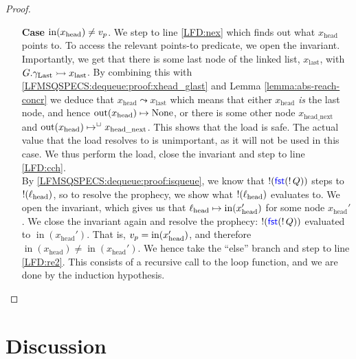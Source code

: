 \documentclass[a4paper, 10pt]{report}
\theoremstyle{definition}
\newcommand{\locN}[1]{\loc_{\mathrm{#1}}}
\newcommand{\lochead}{\locN{head}}
\newcommand{\nIn}[1]{\operatorname{in}(#1)}
\newcommand{\nOut}[1]{\operatorname{out}(#1)}
\newcommand{\node}{x}
\newcommand{\nodeN}[1]{\node_{\mathrm{#1}}}
\newcommand{\nodehead}{\nodeN{head}}
\newcommand{\nodelast}{\nodeN{last}}
\newcommand{\nodeheadnext}{\nodeN{head\_next}}
\newcommand{\prophval}{\val_p}
\newcommand{\Qg}{G}
\newcommand{\glast}{\gname_{\mathrm{Last}}}
\newcommand{\reach}[2]{#1 \leadsto #2}
\newcommand{\ap}[2]{#1 \rightarrowtail #2}
\begin{document}
\begin{proof}
\begin{itemize}
    \item[\textbf{Case}] $\nIn{\nodehead} \neq \prophval$.
    We step to line \ref{LFD:nex} which finds out what $\nodehead$ points to. To access the relevant points-to predicate, we open the invariant. Importantly, we get that there is some last node of the linked list, $\nodelast$, with $\ap{\Qg.\glast}{\nodelast}$. By combining this with \ref{LFMSQSPECS:dequeue:proof:xhead_glast} and Lemma \ref{lemma:abs-reach-concr} we deduce that $\reach{\nodehead}{\nodelast}$ which means that either $\nodehead$ \textit{is} the last node, and hence $\nOut{\nodehead} \mapsto \None$, or there is some other node $\nodeheadnext$ and $\nOut{\nodehead} \mapsto^{\persistently} \nodeheadnext$. This shows that the load is safe. The actual value that the load resolves to is unimportant, as it will not be used in this case. We thus perform the load, close the invariant and step to line \ref{LFD:cch}.\\
    By \ref{LFMSQSPECS:dequeue:proof:isqueue}, we know that $\mathop{!}(\operatorname{\textsf{\color{blue} fst}} (\mathop{!} Q))$ steps to $\deref(\lochead)$, so to resolve the prophecy, we show what $\deref(\lochead)$ evaluates to. We open the invariant, which gives us that $\lochead \mapsto \nIn{\nodehead'}$ for some node $\nodehead'$. We close the invariant again and resolve the prophecy: $\mathop{!}(\operatorname{\textsf{\color{blue} fst}} (\mathop{!} Q))$ evaluated to $\nIn{\nodehead'}$. That is, $\prophval = \nIn{\nodehead'}$, and therefore $\nIn{\nodehead} \neq \nIn{\nodehead'}$. We hence take the ``else'' branch and step to line \ref{LFD:re2}. This consists of a recursive call to the loop function, and we are done by the induction hypothesis.
  \end{itemize}
\end{proof}

\section{Discussion}
\label{LFMSQSPECS:section:discussion}
\end{document}
